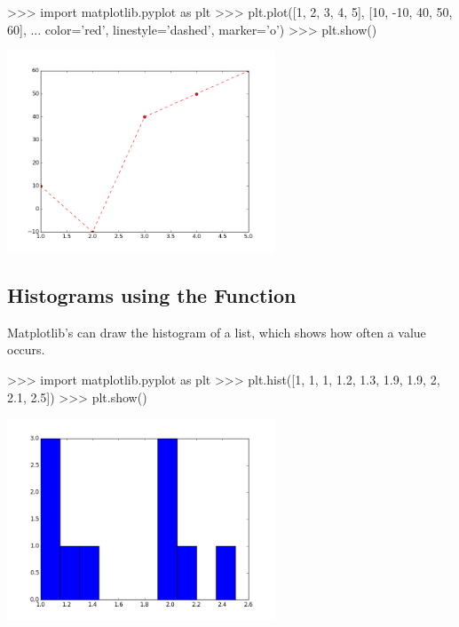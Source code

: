 \documentclass[11pt]{cselabheader}
\begin{document}
\begin{pyconcode}
>>> import matplotlib.pyplot as plt
>>> plt.plot([1, 2, 3, 4, 5], [10, -10, 40, 50, 60],
...          color='red', linestyle='dashed', marker='o')
>>> plt.show()
\end{pyconcode}

\begin{center}
\includegraphics[width=0.6\textwidth]{img/matplotlib_plot2.png}
\end{center}

\subsection{Histograms using the 
Function}

Matplotlib's  can draw the histogram of a
list, which shows how often a value occurs.

\begin{pyconcode}
>>> import matplotlib.pyplot as plt
>>> plt.hist([1, 1, 1, 1.2, 1.3, 1.9, 1.9, 2, 2.1, 2.5])
>>> plt.show()
\end{pyconcode}

\begin{center}
\includegraphics[width=0.6\textwidth]{img/matplotlib_hist1.png}
\end{center}
\end{document}
